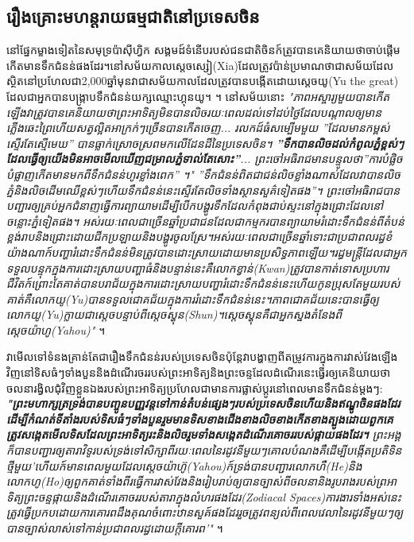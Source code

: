 \documentclass[10pt,twocolumn,letterpaper]{article}
\begin{document}
\subsection{រឿងគ្រោះមហន្តរាយធម្មជាតិនៅប្រទេសចិន}

នៅផ្នែកម្ខាងទៀតនៃសមុទ្រប៉ាស៊ីហ្វិក សង្គមដ៍ទំនើបរបស់ជនជាតិចិនក៍ត្រូវបានគេនិយាយថាចាប់ផ្តើមកើតមានទឹកជំនន់ផងដែរ។​នៅសម័យកាលស្តេចស្សៀ(Xia)ដែលត្រូវប៉ាន់ប្រមាណថាជាសម័យដែលស្ថិតនៅប្រហែលជា2,000ឆ្នាំមុន​​​វាជាសម័យកាលដែលត្រូវបានបង្កើតដោយស្តេចយូ​(Yu the great) ដែលជាអ្នកបានបង្ក្រាបទឹកជំនន់យក្សឈ្មោះ​ហ្គុន​យូ។  \cite{6}។ នៅសម័យនោះ \textit{"ភាពអស្ចារ្យមួយបានកើតឡើង​វាត្រូវបានគេនិយាយថាព្រះអាទិត្យមិនបានលិចរយៈពេលដល់ទៅដប់ថ្ងៃ​ដែលបណ្តាលឲ្យមានភ្លើងឆេះព្រៃ​ហើយសត្វល្អិតអាក្រក់ៗច្រើនបានកើតចេញ... រលកដ៍ធំសម្បើមមួយ ''ដែលមានកម្ពស់ស្ទើរតែស្មើមេឃ'' បានធ្លាក់ស្រោចស្រពមកលើដែនដីនៃប្រទេសចិន។ \textbf{''ទឹកបានលិចដល់កំពូលភ្នំខ្ពស់ៗ​ដែលធ្វើឲ្យយើងមិនអាចមើលឃើញជម្រាលភ្នំទាល់តែសោះ''}... ព្រះចៅអធិរាជមានបន្ទូលថា\textit{''ការបំផ្លិចបំផ្លាញកើតមានមកពីទឹកជំនន់ហូរខ្លាំងពេក'' ។"} \textit{''ទឹកជំនន់ពិតជាជន់លិចខ្លាំងណាស់ដែលវាបានលិចភ្នំនិងលិចដើមឈើខ្ពស់ៗ​ហើយទឹកជំនន់នេះស្ទើរតែលិចទាំងស្ថានសួគ៌ទៀតផង''។} ព្រះចៅអធិរាជបានបញ្ជារឲ្យគ្រប់អ្នកជំនាញធ្វើការព្យាយាមដើម្បីបើកបង្ហូរទឹកដែលកំពុងជាប់ស្ទះនៅក្នុងជ្រោះដែលនៅចន្លោះភ្នំទៀតផង។ អស់រយៈពេលជាច្រើនឆ្នាំប្រជាជនដែលជាកម្មករបានព្យាយាមរំដោះទឹកជំនន់ពីតំបន់ខ្ពង់រាបនិងជ្រោះដោយជីកប្រឡាយនិងបង្ហូរចូលស្រែ។អស់រយៈពេលជាច្រើនឆ្នាំទោះជាប្រជាពលរដ្ធខំយ៉ាងណាក៍បញ្ហារំដោះទឹកជំនន់មិនត្រូវបានដោះស្រាយដោយមានប្រសិទ្ធភាពឡើយ។​រដ្ធមន្ត្រីដែលជាអ្នកទទួលបន្ទុកក្នុងការដោះស្រាយបញ្ហាធំនិងបន្ទាន់នេះគឺលោកខ្វាន់​(Kwan)ត្រូវបានកាត់ទោសប្រហារជីវិតក៍ព្រោះតែគាត់បានបរាជ័យក្នុងការដោះស្រាយបញ្ហារំដោះទឹកជំនន់នេះ​​​ហើយកូនប្រុសតែមួយរបស់គាត់គឺលោកយូ​(Yu)បានទទួលជោគជ័យក្នុងការរំដោះទឹកជំនន់នេះ។​ភាពជោគជ័យនេះបានធ្វើឲ្យលោកយូ(Yu)ក្លាយជាស្តេចបន្ទាប់ពីស្តេចស្ហុន(Shun)។សេ្តចស្ហុនគឺជាអ្នកស្នងតំនែងពីសេ្តចយ៉ាហូ(Yahou)"} \cite{5}។

 វាមើលទៅទំនងគ្រាន់តែជារឿងទឹកជំនន់របស់ប្រទេសចិន​ប៉ុន្តែវាបង្ហាញពីតម្រូវការក្នុងការវាស់វែងឡើងវិញនៅទិសធំៗទាំងបួន​និង​ដំណើរចររបស់ព្រះអាទិត្យនិងព្រះចន្ទ​ដែលដំណើរនេះធ្វើរឲ្យគេនិយាយថាចលនារង្វិលជុំវិញខ្លួនឯងរបស់ព្រះអាទិត្យប្រហែលជាមានការផ្លាស់ប្តូរនៅពេលមានទឹកជំនន់ម្តងៗ: \textit{\textbf{"ព្រះមហាក្សត្រទ្រង់បានបញ្ចូនបញ្ញវន្តទៅកាន់តំបន់ផ្សេងៗរបស់ប្រទេសចិន​ហើយនិងឥណ្ឌូចិនផងដែរ​ដើម្បីកំណត់ទីតាំងរបស់ទិសធំៗទាំងបួនរួមមានទិស​ខាងជើង​ខាងលិច​ខាងកើត​ខាងត្បូង​ដោយពួកគេត្រូវសង្កេតមើលទិសដែលព្រះអាទិត្យរះនិងលិច​រួមទាំងសង្កេតដំណើរគោចររបស់ផ្កាយផងដែរ។} ព្រះអង្គក៏បានបញ្ជារឲ្យតារាវិទូរបស់ទ្រង់ទៅសិក្សាពីរយៈពេលនៃរដូវនីមួយៗ​គោលបំណងគឺដើម្បីបង្កើតប្រតិទិនថ្មីមួយ​​​'ហើយក៍មានពេលមួយដែលស្តេចយ៉ាហ៊ូ(Yahou)ក៍ទ្រង់បានបញ្ជារលោក​ហឺ(He)​និង​លោកហូ(Ho)ឲ្យពួកគាត់ទាំងពីរធ្វើការវាស់វែងនិងរៀបរាប់ឲ្យបានច្បាស់ពីចលនា​និង​រូបរាងរបស់ព្រអាទិត្យ​ព្រះចន្ទ​ផ្កាយ​និង​ដំណើរគោចររបស់តារាក្នុងលំហរផងដែរ(Zodiacal Spaces)ការងារទាំងអស់នេះត្រូវធ្វើប្រកបដោយការគោរពដឹងគុណចំពោះឋានសួគ៍ផងដែរ​រួចត្រូវពន្យល់ពីពេលវេលានៃរដូវនីមួយៗឲ្យបានច្បាស់លាស់ទៅកាន់ប្រជាពលរដ្ធដោយក្តីគោរព​'"} \cite{5}។
\end{document}
